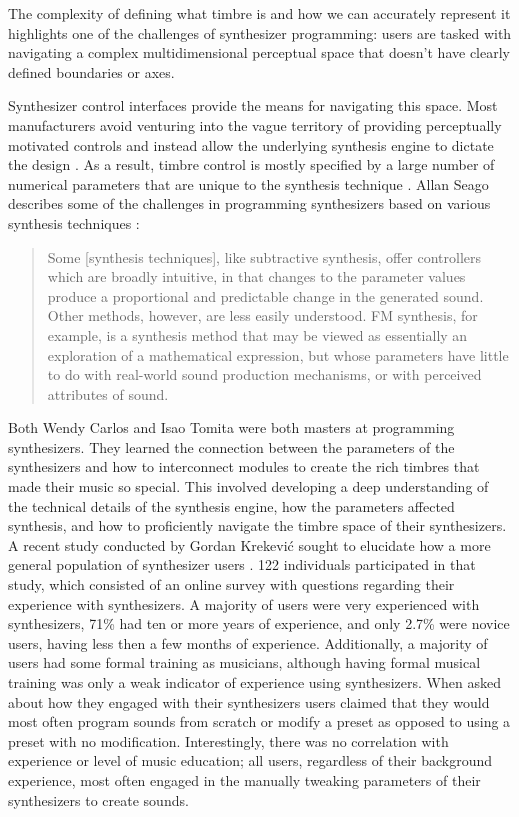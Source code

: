 The complexity of defining what timbre is and how we can accurately represent it highlights one of the challenges of synthesizer programming: users are tasked with navigating a complex multidimensional perceptual space that doesn't have clearly defined boundaries or axes. 

Synthesizer control interfaces provide the means for navigating this space. Most manufacturers avoid venturing into the vague territory of providing perceptually motivated controls and instead allow the underlying synthesis engine to dictate the design \cite{seago2004critical}. As a result, timbre control is mostly specified by a large number of numerical parameters that are unique to the synthesis technique \cite{ethington1994seawave}. Allan Seago describes some of the challenges in programming synthesizers based on various synthesis techniques \cite{seago2013new}:

\begin{quote}
    Some [synthesis techniques], like subtractive synthesis, offer controllers which are broadly intuitive, in that changes to the parameter values produce a proportional and predictable change in the generated sound. Other methods, however, are less easily understood. FM synthesis, for example, is a synthesis method that may be viewed as essentially an exploration of a mathematical expression, but whose parameters have little to do with real-world sound production mechanisms, or with perceived attributes of sound.
\end{quote}

Both Wendy Carlos and Isao Tomita were both masters at programming synthesizers. They learned the connection between the parameters of the synthesizers and how to interconnect modules to create the rich timbres that made their music so special. This involved developing a deep understanding of the technical details of the synthesis engine, how the parameters affected synthesis, and how to proficiently navigate the timbre space of their synthesizers. A recent study conducted by Gordan Krekevi\'{c} sought to elucidate how a more general population of synthesizer users \cite{krekovic2019insights}. 122 individuals participated in that study, which consisted of an online survey with questions regarding their experience with synthesizers. A majority of users were very experienced with synthesizers, 71\% had ten or more years of experience, and only 2.7\% were novice users, having less then a few months of experience. Additionally, a majority of users had some formal training as musicians, although having formal musical training was only a weak indicator of experience using synthesizers. When asked about how they engaged with their synthesizers users claimed that they would most often program sounds from scratch or modify a preset as opposed to using a preset with no modification. Interestingly, there was no correlation with experience or level of music education; all users, regardless of their background experience, most often engaged in the manually tweaking parameters of their synthesizers to create sounds. 

